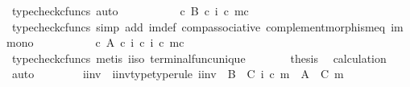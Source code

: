 \begin{isabellebody}
\ {\isacharparenleft}{\kern0pt}typecheck{\isacharunderscore}{\kern0pt}cfuncs{\isacharcomma}{\kern0pt}\ auto{\isacharparenright}{\kern0pt}\isanewline
\ \ \ \ \isamarkupfalse%
\ \isamarkupfalse%
\ {\isachardoublequoteopen}{\isachardot}{\kern0pt}{\isachardot}{\kern0pt}{\isachardot}{\kern0pt}\ {\isacharequal}{\kern0pt}\ {\isasymf}\ {\isasymcirc}\isactrlsub c\ {\isasymbeta}\isactrlbsub B\isactrlesub \ {\isasymcirc}\isactrlsub c\ {\isacharparenleft}{\kern0pt}i\ {\isasymcirc}\isactrlsub c\ m{\isacharparenright}{\kern0pt}\isactrlsup c{\isachardoublequoteclose}\isanewline
\ \ \ \ \ \ \isamarkupfalse%
\ {\isacharparenleft}{\kern0pt}typecheck{\isacharunderscore}{\kern0pt}cfuncs{\isacharcomma}{\kern0pt}\ simp\ add{\isacharcolon}{\kern0pt}\ {\isasymchi}im{\isacharunderscore}{\kern0pt}def\ comp{\isacharunderscore}{\kern0pt}associative{}\ complement{\isacharunderscore}{\kern0pt}morphism{\isacharunderscore}{\kern0pt}eq\ im{\isacharunderscore}{\kern0pt}mono{\isacharparenright}{\kern0pt}\isanewline
\ \ \ \ \isamarkupfalse%
\ \isamarkupfalse%
\ {\isachardoublequoteopen}{\isachardot}{\kern0pt}{\isachardot}{\kern0pt}{\isachardot}{\kern0pt}\ {\isacharequal}{\kern0pt}\ {\isasymf}\ {\isasymcirc}\isactrlsub c\ {\isasymbeta}\isactrlbsub A\isactrlesub \ {\isasymcirc}\isactrlsub c\ {\isacharparenleft}{\kern0pt}i\isactrlbold {\isasyminverse}\ {\isasymcirc}\isactrlsub c\ {\isacharparenleft}{\kern0pt}i\ {\isasymcirc}\isactrlsub c\ m{\isacharparenright}{\kern0pt}\isactrlsup c{\isacharparenright}{\kern0pt}{\isachardoublequoteclose}\isanewline
\ \ \ \ \ \ \isamarkupfalse%
\ {\isacharparenleft}{\kern0pt}typecheck{\isacharunderscore}{\kern0pt}cfuncs{\isacharcomma}{\kern0pt}\ metis\ i{\isacharunderscore}{\kern0pt}iso\ terminal{\isacharunderscore}{\kern0pt}func{\isacharunderscore}{\kern0pt}unique{\isacharparenright}{\kern0pt}\isanewline
\ \ \ \ \isamarkupfalse%
\ \isamarkupfalse%
\ {\isacharquery}{\kern0pt}thesis\ \isamarkupfalse%
\ calculation\ \isamarkupfalse%
\ auto\isanewline
\ \ \isamarkupfalse%
\isanewline
\ \ \isamarkupfalse%
\ \isamarkupfalse%
\ i{\isacharprime}{\kern0pt}{\isacharunderscore}{\kern0pt}inv\ \ i{\isacharprime}{\kern0pt}{\isacharunderscore}{\kern0pt}inv{\isacharunderscore}{\kern0pt}type{\isacharbrackleft}{\kern0pt}type{\isacharunderscore}{\kern0pt}rule{\isacharbrackright}{\kern0pt}{\isacharcolon}{\kern0pt}\ {\isachardoublequoteopen}i{\isacharprime}{\kern0pt}{\isacharunderscore}{\kern0pt}inv\ {\isacharcolon}{\kern0pt}\ B\ {\isasymsetminus}\ {\isacharparenleft}{\kern0pt}C{\isacharcomma}{\kern0pt}\ i\ {\isasymcirc}\isactrlsub c\ m{\isacharparenright}{\kern0pt}\ {\isasymrightarrow}\ A\ {\isasymsetminus}\ {\isacharparenleft}{\kern0pt}C{\isacharcomma}{\kern0pt}\ m{\isacharparenright}{\kern0pt}{\isachardoublequoteclose}\isanewline

\end{isabellebody}
